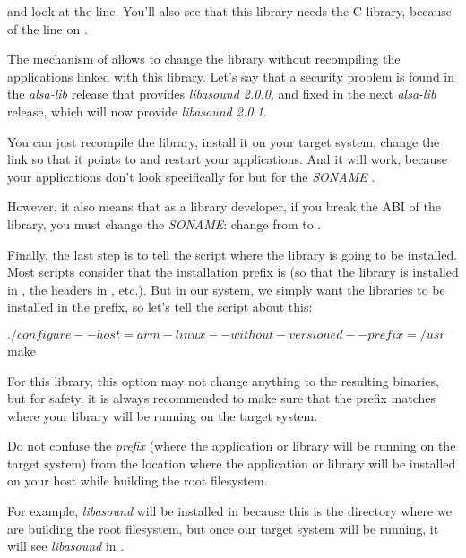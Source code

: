 and look at the  line. You'll also see that this
library needs the C library, because of the  line on
.

The mechanism of  allows to change the library without
recompiling the applications linked with this library. Let's say that
a security problem is found in the {\em alsa-lib} release that provides
{\em libasound 2.0.0}, and fixed in the next {\em alsa-lib} release, which will
now provide {\em libasound 2.0.1}.

You can just recompile the library, install it on your target system,
change the  link so that it points to
 and restart your applications. And it will
work, because your applications don't look specifically for
 but for the {\em SONAME}
.

However, it also means that as a library developer, if you break the
ABI of the library, you must change the {\em SONAME}: change from
 to .

Finally, the last step is to tell the  script where the
library is going to be installed. Most  scripts consider that
the installation prefix is  (so that the library is
installed in , the headers in
, etc.). But in our system, we simply want
the libraries to be installed in the  prefix, so let's tell
the  script about this:

\begin{bashinput}
$ ./configure --host=arm-linux  --without-versioned --prefix=/usr
$ make
\end{bashinput}

For this library, this option may not change anything to the resulting
binaries, but for safety, it is always recommended to make sure that
the prefix matches where your library will be running on the target
system.

Do not confuse the {\em prefix} (where the application or library will
be running on the target system) from the location where the
application or library will be installed on your host while building
the root filesystem.

For example, {\em libasound} will be installed in
 because this is
the directory where we are building the root filesystem, but once our
target system will be running, it will see {\em libasound} in
.

